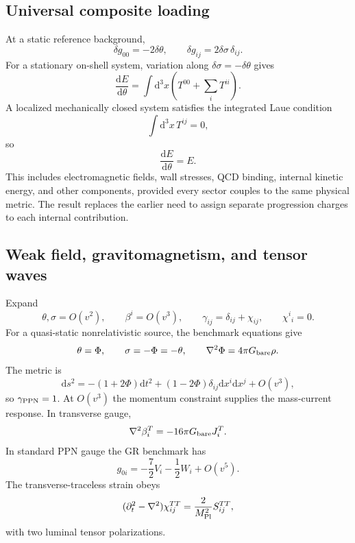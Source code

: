 \documentclass[11pt]{article}
\newcommand{\Mpl}{M_{\rm Pl}}
\newcommand{\Gb}{G_{\rm bare}}
\newcommand{\dd}{\mathrm{d}}
\newcommand{\gppn}{\gamma_{\rm PPN}}
\begin{document}
\subsection{Universal composite loading}

At a static reference background,
\begin{equation}
\delta g_{00}=-2\delta\theta,\qquad \delta g_{ij}=2\delta\sigma\,\delta_{ij}.
\end{equation}
For a stationary on-shell system, variation along $\delta\sigma=-\delta\theta$ gives
\begin{equation}
\frac{\dd E}{\dd\theta}=\int \dd^3x\left(T^{00}+\sum_iT^{ii}\right).
\label{eq:loading}
\end{equation}
A localized mechanically closed system satisfies the integrated Laue condition
\begin{equation}
\int \dd^3x\,T^{ij}=0,
\label{eq:Laue}
\end{equation}
so
\begin{equation}
\frac{\dd E}{\dd\theta}=E.
\label{eq:unitloading}
\end{equation}
This includes electromagnetic fields, wall stresses, QCD binding, internal kinetic energy, and other components, provided every sector couples to the same physical metric.  The result replaces the earlier need to assign separate progression charges to each internal contribution.

\subsection{Weak field, gravitomagnetism, and tensor waves}

Expand
\begin{equation}
\theta,\sigma=O(v^2),\qquad \beta^i=O(v^3),\qquad
\gamma_{ij}=\delta_{ij}+\chi_{ij},\qquad \chi^i{}_i=0.
\end{equation}
For a quasi-static nonrelativistic source, the benchmark equations give
\begin{equation}
\theta=\Phi,\qquad \sigma=-\Phi=-\theta,
\qquad \nabla^2\Phi=4\pi\Gb\rho.
\label{eq:benchmarkrecip}
\end{equation}
The metric is
\begin{equation}
\dd s^2=-(1+2\Phi)\dd t^2+(1-2\Phi)\delta_{ij}\dd x^i\dd x^j+O(v^3),
\end{equation}
so $\gppn=1$.  At $O(v^3)$ the momentum constraint supplies the mass-current response.  In transverse gauge,
\begin{equation}
\nabla^2\beta_i^T=-16\pi\Gb J_i^T.
\end{equation}
In standard PPN gauge the GR benchmark has
\begin{equation}
g_{0i}=-\frac72V_i-\frac12W_i+O(v^5).
\end{equation}
The transverse-traceless strain obeys
\begin{equation}
(\partial_t^2-\nabla^2)\chi_{ij}^{TT}=\frac{2}{\Mpl^2}S_{ij}^{TT},
\end{equation}
with two luminal tensor polarizations.
\end{document}
